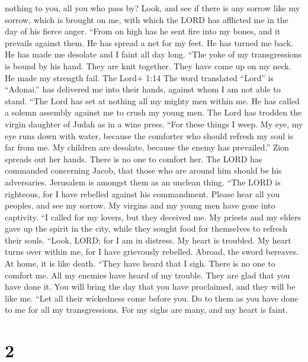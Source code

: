nothing to you, all you who pass by? Look, and see if there is any
sorrow like my sorrow, which is brought on me, with which the LORD has
afflicted me in the day of his fierce anger.  ``From on
high has he sent fire into my bones, and it prevails against them. He
has spread a net for my feet. He has turned me back. He has made me
desolate and I faint all day long.  ``The yoke of my
transgressions is bound by his hand. They are knit together. They have
come up on my neck. He made my strength fail. The Lord+ 1:14 The word
translated ``Lord'' is ``Adonai.'' has delivered me into their hands,
against whom I am not able to stand.  ``The Lord has set at
nothing all my mighty men within me. He has called a solemn assembly
against me to crush my young men. The Lord has trodden the virgin
daughter of Judah as in a wine press.  ``For these things I
weep. My eye, my eye runs down with water, because the comforter who
should refresh my soul is far from me. My children are desolate, because
the enemy has prevailed.''  Zion spreads out her hands.
There is no one to comfort her. The LORD has commanded concerning Jacob,
that those who are around him should be his adversaries. Jerusalem is
amongst them as an unclean thing.  ``The LORD is righteous,
for I have rebelled against his commandment. Please hear all you
peoples, and see my sorrow. My virgins and my young men have gone into
captivity.  ``I called for my lovers, but they deceived me.
My priests and my elders gave up the spirit in the city, while they
sought food for themselves to refresh their souls.  ``Look,
LORD; for I am in distress. My heart is troubled. My heart turns over
within me, for I have grievously rebelled. Abroad, the sword bereaves.
At home, it is like death.  ``They have heard that I sigh.
There is no one to comfort me. All my enemies have heard of my trouble.
They are glad that you have done it. You will bring the day that you
have proclaimed, and they will be like me.  ``Let all their
wickedness come before you. Do to them as you have done to me for all my
transgressions. For my sighs are many, and my heart is faint.

\hypertarget{section-1}{%
\section{2}\label{section-1}}

